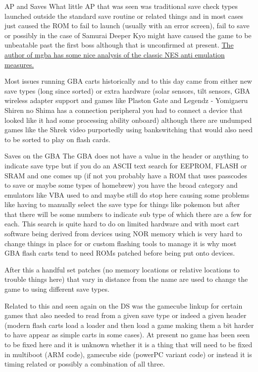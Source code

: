 \documentclass[
]{book}
\begin{document}
AP and Saves What little AP that was seen was traditional save check types launched outside the standard save routine or related things and in most cases just caused the ROM to fail to launch (usually with an error screen), fail to save or possibly in the case of Samurai Deeper Kyo might have caused the game to be unbeatable past the first boss although that is unconfirmed at present. \href{https://mgba.io/2014/12/28/classic-nes/}{The author of mgba has some nice analysis of the classic NES anti emulation measures.}

Most issues running GBA carts historically and to this day came from either new save types (long since sorted) or extra hardware (solar sensors, tilt sensors, GBA wireless adapter support and games like Plaston Gate and Legendz - Yomigaeru Shiren no Shima has a connection peripheral you had to connect a device that looked like it had some processing ability onboard) although there are undumped games like the Shrek video purportedly using bankswitching that would also need to be sorted to play on flash cards.

Saves on the GBA The GBA does not have a value in the header or anything to indicate save type but if you do an ASCII text search for EEPROM, FLASH or SRAM and one comes up (if not you probably have a ROM that uses passcodes to save or maybe some types of homebrew) you have the broad category and emulators like VBA used to and maybe still do stop here causing some problems like having to manually select the save type for things like pokemon but after that there will be some numbers to indicate sub type of which there are a few for each. This search is quite hard to do on limited hardware and with most cart software being derived from devices using NOR memory which is very hard to change things in place for or custom flashing tools to manage it is why most GBA flash carts tend to need ROMs patched before being put onto devices.

After this a handful set patches (no memory locations or relative locations to trouble things here) that vary in distance from the name are used to change the game to using different save types.

Related to this and seen again on the DS was the gamecube linkup for certain games that also needed to read from a given save type or indeed a given header (modern flash carts load a loader and then load a game making them a bit harder to have appear as simple carts in some cases). At present no game has been seen to be fixed here and it is unknown whether it is a thing that will need to be fixed in multiboot (ARM code), gamecube side (powerPC variant code) or instead it is timing related or possibly a combination of all three.
\end{document}
